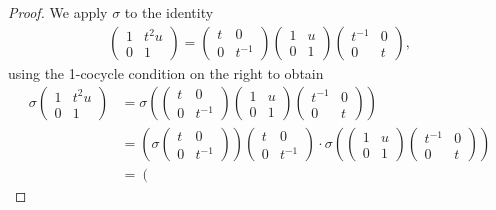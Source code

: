 \begin{proof}
We apply $\sigma$ to the identity
\begin{align*}
\left(\begin{matrix}
1 & t^2u \\ 0 & 1
\end{matrix}\right) =
\left(\begin{matrix}
t & 0 \\ 0 & t^{-1}
\end{matrix}\right)
\left(\begin{matrix}
1 & u \\ 0 & 1
\end{matrix}\right)
\left(\begin{matrix}
t^{-1} & 0 \\ 0 & t
\end{matrix}\right),
\end{align*}
using the 1-cocycle condition on the right to obtain
\begin{align*}
\sigma
\left(\begin{matrix}
1 & t^2u \\ 0 & 1
\end{matrix}\right)
&=\sigma\left(
\left(\begin{matrix}
t & 0 \\ 0 & t^{-1}
\end{matrix}\right)
\left(\begin{matrix}
1 & u \\ 0 & 1
\end{matrix}\right)
\left(\begin{matrix}
t^{-1} & 0 \\ 0 & t
\end{matrix}\right)
\right)  \\
&=
\left(\sigma
\left(\begin{matrix}
t & 0 \\ 0 & t^{-1}
\end{matrix}\right)
\right)
\left(\begin{matrix}
t & 0 \\ 0 & t^{-1}
\end{matrix}\right) \cdot
\sigma\left(
\left(\begin{matrix}
1 & u \\ 0 & 1
\end{matrix}\right)
\left(\begin{matrix}
t^{-1} & 0 \\ 0 & t
\end{matrix}\right)
\right)\\
&=
\left(\begin{matrix}

\end{matrix}
\end{align*}
\end{proof}

